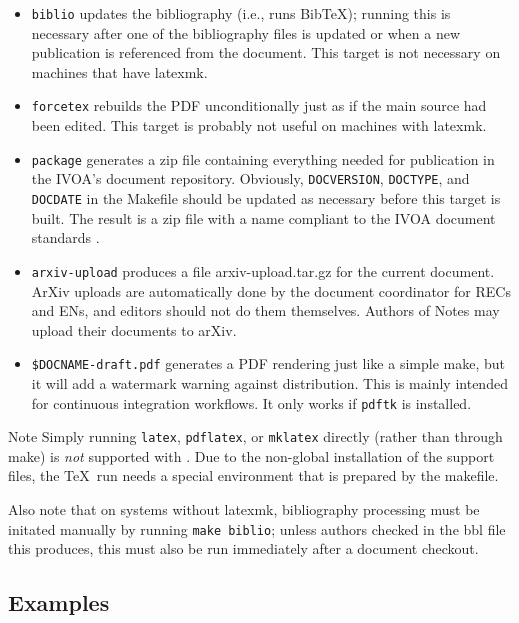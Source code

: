 \documentclass[11pt,a4paper]{ivoa}
\newcommand{\BibTeX}{Bib\TeX}
\begin{document}
\begin{itemize}
\item \texttt{biblio} updates the bibliography (i.e., runs \BibTeX);
running this is necessary after one of the bibliography files is updated
or when a new publication is referenced from the document.  This target
is not necessary on machines that have latexmk.

\item \texttt{forcetex} rebuilds the PDF unconditionally just as if the
main source had been edited.  This target is probably not useful on
machines with latexmk.

\item \texttt{package} generates a zip file containing everything needed
for publication in the IVOA's document repository.   Obviously,
\texttt{DOCVERSION}, \texttt{DOCTYPE}, and \texttt{DOCDATE} in the
Makefile should be updated as necessary before this target is built.
The result is a zip file with a name compliant to the IVOA document
standards \citep{2017ivoa.spec.0517G}.

\item \texttt{arxiv-upload}  produces a file arxiv-upload.tar.gz for
the current document.  ArXiv uploads are automatically done by the
document coordinator for RECs and ENs, and editors should not do
them themselves.  Authors of Notes may upload their documents to arXiv.

\item \texttt{\$DOCNAME-draft.pdf} generates a PDF rendering just like a
simple make, but it will add a watermark warning against distribution.  This is
mainly intended for continuous integration workflows.  It only works
if \verb|pdftk| is installed.
\end{itemize}

\begin{admonition}{Note}
Simply running \texttt{latex}, \texttt{pdflatex},
or \texttt{mklatex} directly
(rather than through make) is \emph{not} supported with \ivoatex.  Due
to the non-global installation of the support files, the \TeX\ run needs
a special environment that is prepared by the makefile.

Also note that on systems without latexmk,
bibliography processing must be initated manually by
running \texttt{make biblio}; unless authors checked in the bbl file
this produces, this must also be run immediately after a document checkout.
\end{admonition}

\subsection{Examples}
\end{document}
